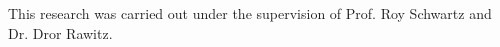 This research was carried out under the supervision of Prof. Roy Schwartz and Dr. Dror Rawitz.

\begin{bibunit}
    \renewcommand\bibname{Publication List}
    \makeatletter
    \renewcommand\@biblabel[1]{#1.}
    \makeatother
    \nocite{*}
\end{bibunit}